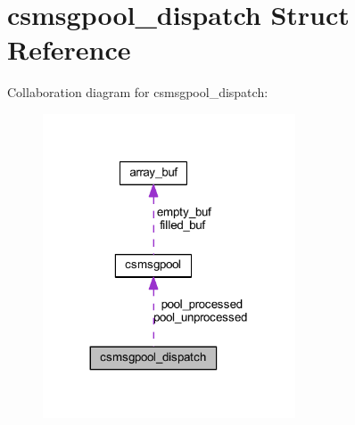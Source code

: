 \hypertarget{structcsmsgpool__dispatch}{}\section{csmsgpool\+\_\+dispatch Struct Reference}
\label{structcsmsgpool__dispatch}


Collaboration diagram for csmsgpool\+\_\+dispatch\+:
\nopagebreak
\begin{figure}[H]
\begin{center}
\leavevmode
\includegraphics[width=212pt]{structcsmsgpool__dispatch__coll__graph}
\end{center}
\end{figure}
